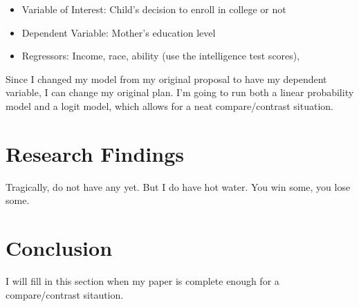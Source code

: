 \documentclass{article}
\begin{document}
\begin{itemize}
    \item Variable of Interest: Child’s decision to enroll in college or not
    \item Dependent Variable: Mother’s education level
    \item Regressors: Income, race, ability (use the intelligence test scores), 
\end{itemize}

Since I changed my model from my original proposal to have my dependent variable, I can change my original plan. I'm going to run both a linear probability model and a logit model, which allows for a neat compare/contrast situation.

\section{Research Findings}

Tragically, do not have any yet. But I do have hot water. You win some, you lose some.

\section{Conclusion}

I will fill in this section when my paper is complete enough for a compare/contrast sitaution.


\end{document}
